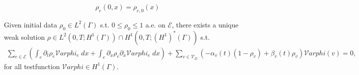 \begin{equation}
    \label{eq:initial_conditions}
    \rho_e(0,x) = \rho_{e, 0}(x) 
\end{equation}


\begin{theorem} 
    Given initial data $\rho_0 \in L^2(\Gamma)$ s.t. $0 \le \rho_0 \le 1$ a.e. on $\mathcal{E}$, there exists a unique weak solution $\rho \in L^2(0,T; H^1(\Gamma)) \cap H^1(0,T; (H^1)^*(\Gamma))$ s.t.
	\begin{align*}
		\sum_{e \in \mathcal{E}} \left(\int_e  \partial_t \rho_e \mathcal{V}arphi_e \;dx + \int_e \partial_x \rho_e\partial_x \mathcal{V}arphi_e \;dx\right) + \sum_{v \in \mathcal{V}_D} (-\alpha_v(t) (1-\rho_v) + \beta_v(t) \rho_v)\mathcal{V}arphi(v) = 0,
	\end{align*}
	for all testfunction $\mathcal{V}arphi \in H^1(\Gamma)$.
\end{theorem}

